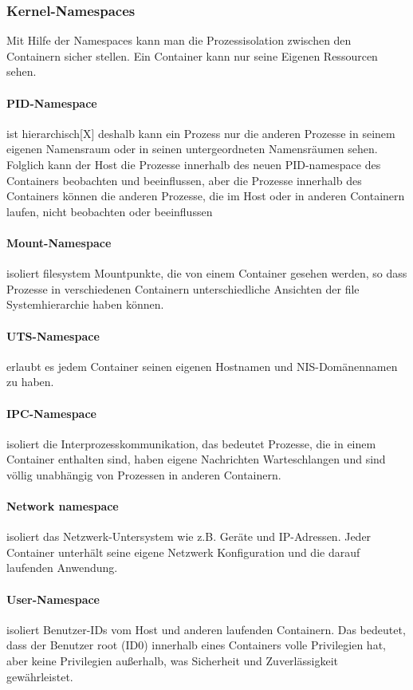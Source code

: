 \documentclass[12pt,a4paper,bibliography=totocnumbered,listof=totocnumbered]{scrartcl}
\begin{document}
\subsubsection{Kernel-Namespaces}
Mit Hilfe der Namespaces kann man die Prozessisolation zwischen den Containern sicher stellen. Ein Container kann nur seine Eigenen Ressourcen sehen.

\paragraph{PID-Namespace} ist hierarchisch[X] deshalb kann ein Prozess nur die anderen Prozesse in seinem eigenen Namensraum oder in seinen untergeordneten Namensräumen sehen. Folglich kann der Host die Prozesse innerhalb des neuen PID-namespace des Containers beobachten und beeinflussen, aber die Prozesse innerhalb des Containers können die anderen Prozesse, die im Host oder in anderen Containern laufen, nicht beobachten oder beeinflussen

\paragraph{Mount-Namespace} isoliert filesystem Mountpunkte, die von einem Container gesehen werden, so dass Prozesse in verschiedenen Containern unterschiedliche Ansichten der file Systemhierarchie haben können.

\paragraph{UTS-Namespace} erlaubt es jedem Container seinen eigenen Hostnamen und NIS-Domänennamen zu haben.

\paragraph{IPC-Namespace} isoliert die Interprozesskommunikation, das bedeutet Prozesse, die in einem Container enthalten sind, haben eigene Nachrichten Warteschlangen und sind völlig unabhängig von Prozessen in anderen Containern.

\paragraph{Network namespace} isoliert das Netzwerk-Untersystem wie z.B. Geräte und IP-Adressen. Jeder Container unterhält seine eigene Netzwerk Konfiguration und die darauf laufenden Anwendung.

\paragraph{User-Namespace} isoliert Benutzer-IDs vom Host und anderen laufenden Containern. Das bedeutet, dass der Benutzer root (ID0) innerhalb eines Containers volle Privilegien hat, aber keine Privilegien außerhalb, was Sicherheit und Zuverlässigkeit gewährleistet. \cite{Xavier2015AClouds}
	
\end{document}
